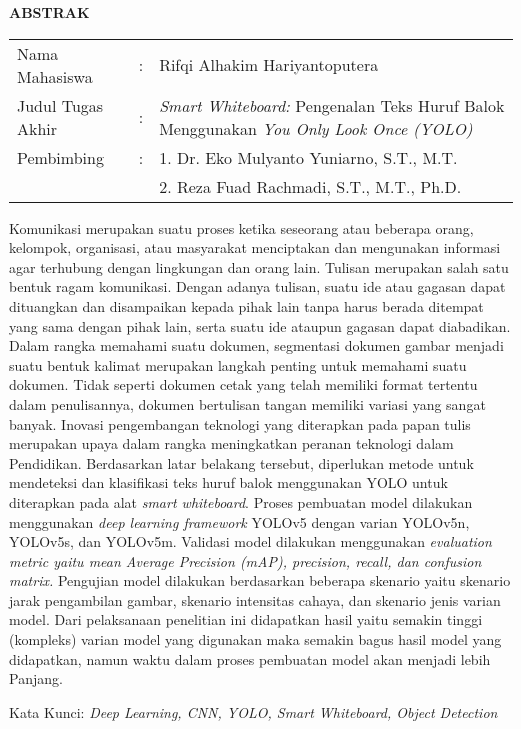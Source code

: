 \begin{center}
  \large\textbf{ABSTRAK}
\end{center}


\vspace{2ex}

\begingroup
  \setlength{\tabcolsep}{0pt}

  \noindent
  \begin{tabularx}{\textwidth}{l >{\centering}m{2em} X}
    Nama Mahasiswa    &:& Rifqi Alhakim Hariyantoputera \\

    Judul Tugas Akhir &:&	\textit{Smart Whiteboard:} Pengenalan Teks Huruf Balok Menggunakan \textit{You Only Look Once (YOLO)} \\

    Pembimbing        &:& 1. Dr. Eko Mulyanto Yuniarno, S.T., M.T. \\
                      & & 2. Reza Fuad Rachmadi, S.T., M.T., Ph.D. \\
  \end{tabularx}
\endgroup

Komunikasi merupakan suatu proses ketika seseorang atau beberapa orang, kelompok, organisasi, atau masyarakat menciptakan dan mengunakan informasi agar terhubung dengan lingkungan dan orang lain. Tulisan merupakan salah satu bentuk ragam komunikasi. Dengan adanya tulisan, suatu ide atau gagasan dapat dituangkan dan disampaikan kepada pihak lain tanpa harus berada ditempat yang sama dengan pihak lain, serta suatu ide ataupun gagasan dapat diabadikan. Dalam rangka memahami suatu dokumen, segmentasi dokumen gambar menjadi suatu bentuk kalimat merupakan langkah penting untuk memahami suatu dokumen. Tidak seperti dokumen cetak yang telah memiliki format tertentu dalam penulisannya, dokumen bertulisan tangan memiliki variasi yang sangat banyak. Inovasi pengembangan teknologi yang diterapkan pada papan tulis merupakan upaya dalam rangka meningkatkan peranan teknologi dalam Pendidikan. Berdasarkan latar belakang tersebut, diperlukan metode untuk mendeteksi dan klasifikasi teks huruf balok menggunakan YOLO untuk diterapkan pada alat \textit{smart whiteboard}. Proses pembuatan model dilakukan menggunakan \textit{deep learning framework} YOLOv5 dengan varian YOLOv5n, YOLOv5s, dan YOLOv5m. Validasi model dilakukan menggunakan \textit{evaluation metric \textnormal{yaitu} mean Average Precision (mAP), precision, recall, \textnormal{dan} confusion matrix.} Pengujian model dilakukan berdasarkan beberapa skenario yaitu skenario jarak pengambilan gambar, skenario intensitas cahaya, dan skenario jenis varian model. Dari pelaksanaan penelitian ini didapatkan hasil yaitu semakin tinggi (kompleks) varian model yang digunakan maka semakin bagus hasil model yang didapatkan, namun waktu dalam proses pembuatan model akan menjadi lebih Panjang.

Kata Kunci: \textit{Deep Learning, CNN, YOLO, Smart Whiteboard, Object Detection}

